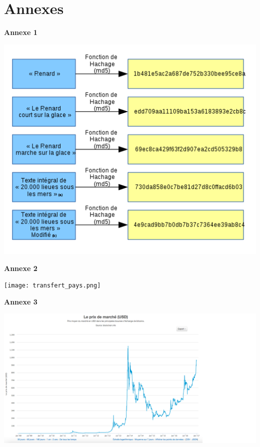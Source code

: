 \documentclass[12pt]{report}
\begin{document}
\newpage
\section{Annexes}

\textbf{Annexe 1}\\
\begin{center}
    \includegraphics[width=1.2\textwidth]{hashage}
\end{center}

\newpage
\textbf{Annexe 2}\\
\begin{center}
   \texttt{[image: transfert\_pays.png]}
\end{center}

\newpage
\textbf{Annexe 3}\\
\begin{center}
    \includegraphics[width=1.3\textwidth]{courbeBTC}
\end{center}
\end{document}
